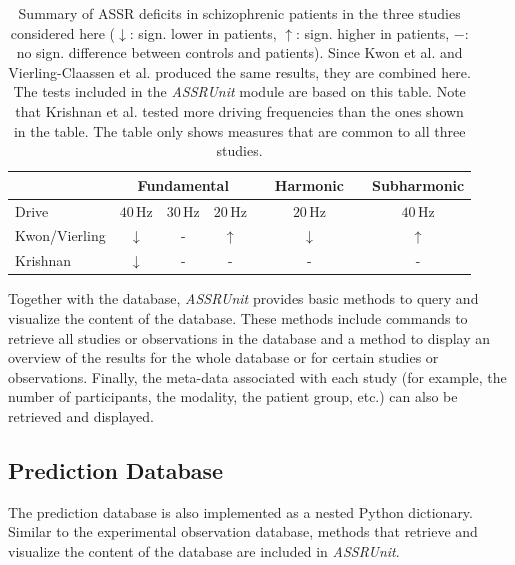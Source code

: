 \documentclass[CompPsych]{stjour}
\begin{document}
\begin{table}[h!]
\centering
\label{Tab:Experiments} 
\caption{Summary of ASSR deficits in schizophrenic patients in the three studies considered here ($\downarrow$: sign. lower in patients, $\uparrow$: sign. higher in patients, $-$: no sign. difference between controls and patients). 
Since Kwon et al. \cite{Kwon1999} and Vierling-Claassen et al. \cite{Vierling2008}
produced the same results, they are combined here. The tests included in the \textit{ASSRUnit} module are based on this table. Note that Krishnan et al. \cite{Krishnan2009} tested more driving frequencies than the ones shown in the table. 
The table only shows measures that are common to all three studies.}
\begin{tabular}{lccccccc}
\hline
& \multicolumn{3}{c}{Fundamental}& \phantom{a} & Harmonic & \phantom{a} & Subharmonic \\
\hline
Drive& $40$\,Hz  & $30$\,Hz  & $20$\,Hz&  & $20$\,Hz & &$40$\,Hz \\
\hline
Kwon/Vierling & $\downarrow$& -& $\uparrow$& &$\downarrow$ & & $\uparrow$\\

Krishnan & $\downarrow$& -& -& &- & &- \\
\hline
\end{tabular}
\end{table}


Together with the database, \textit{ASSRUnit} provides basic methods to query and visualize the content of the database. These methods include commands to retrieve all studies or observations in the database and a method
to display an overview of the results for the whole database or for certain studies or observations. Finally, the meta-data associated with each study (for example, the number of participants, the modality, the patient group, etc.)
can also be retrieved and displayed.


\subsection{Prediction Database}
The prediction database is also implemented as a nested Python dictionary. Similar to the experimental observation database, methods that retrieve and visualize the content of the database are included in \textit{ASSRUnit}.
\end{document}
